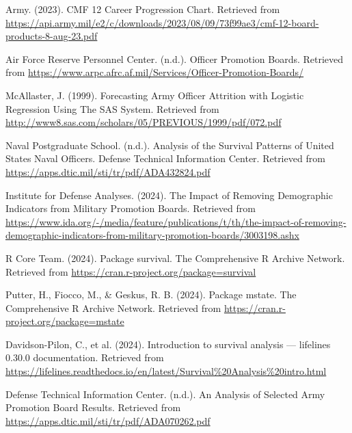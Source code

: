 \documentclass[../main.tex]{subfiles}
\begin{document}

\begin{thebibliography}{99}

Army. (2023). CMF 12 Career Progression Chart. Retrieved from \url{https://api.army.mil/e2/c/downloads/2023/08/09/73f99ae3/cmf-12-board-products-8-aug-23.pdf}

Air Force Reserve Personnel Center. (n.d.). Officer Promotion Boards. Retrieved from \url{https://www.arpc.afrc.af.mil/Services/Officer-Promotion-Boards/}

McAllaster, J. (1999). Forecasting Army Officer Attrition with Logistic Regression Using The SAS System. Retrieved from \url{http://www8.sas.com/scholars/05/PREVIOUS/1999/pdf/072.pdf}

Naval Postgraduate School. (n.d.). Analysis of the Survival Patterns of United States Naval Officers. Defense Technical Information Center. Retrieved from \url{https://apps.dtic.mil/sti/tr/pdf/ADA432824.pdf}

Institute for Defense Analyses. (2024). The Impact of Removing Demographic Indicators from Military Promotion Boards. Retrieved from \url{https://www.ida.org/-/media/feature/publications/t/th/the-impact-of-removing-demographic-indicators-from-military-promotion-boards/3003198.ashx}

R Core Team. (2024). Package survival. The Comprehensive R Archive Network. Retrieved from \url{https://cran.r-project.org/package=survival}

Putter, H., Fiocco, M., \& Geskus, R. B. (2024). Package mstate. The Comprehensive R Archive Network. Retrieved from \url{https://cran.r-project.org/package=mstate}

Davidson-Pilon, C., et al. (2024). Introduction to survival analysis — lifelines 0.30.0 documentation. Retrieved from \url{https://lifelines.readthedocs.io/en/latest/Survival\%20Analysis\%20intro.html}

Defense Technical Information Center. (n.d.). An Analysis of Selected Army Promotion Board Results. Retrieved from \url{https://apps.dtic.mil/sti/tr/pdf/ADA070262.pdf}

\end{thebibliography}
\end{document}
